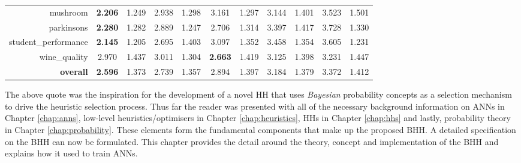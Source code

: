 \begin{table}[htbp]
{\begin{tabular}{rcccccccccc}
    mushroom & \textbf{2.206} & 1.249 & 2.938 & 1.298 & 3.161 & 1.297 & 3.144 & 1.401 & 3.523 & 1.501 \\
    parkinsons & \textbf{2.280} & 1.282 & 2.889 & 1.247 & 2.706 & 1.314 & 3.397 & 1.417 & 3.728 & 1.330 \\
    student\_performance & \textbf{2.145} & 1.205 & 2.695 & 1.403 & 3.097 & 1.352 & 3.458 & 1.354 & 3.605 & 1.231 \\
    wine\_quality & 2.970 & 1.437 & 3.011 & 1.304 & \textbf{2.663} & 1.419 & 3.125 & 1.398 & 3.231 & 1.447 \\
    \midrule
    \textbf{overall} & \textbf{2.596} & 1.373 & 2.739 & 1.357 & 2.894 & 1.397 & 3.184 & 1.379 & 3.372 & 1.412 \\
    \end{tabular}%

    }
  \label{tab:addlabel}%
\end{table}%







The above quote was the inspiration for the development of a novel \ac{HH} that uses \textit{Bayesian} probability concepts as a selection mechanism to drive the heuristic selection process. Thus far the reader was presented with all of the necessary background information on \acp{ANN} in Chapter \ref{chap:anns}, low-level heuristics/optimisers in Chapter \ref{chap:heuristics}, \acp{HH} in Chapter \ref{chap:hhs}  and lastly, probability theory in Chapter \ref{chap:probability}. These elements form the fundamental components that make up the proposed \Ac{BHH}. A detailed specification on the \Ac{BHH} can now be formulated. This chapter provides the detail around the theory, concept and implementation of the \Ac{BHH} and explains how it used to train \acp{ANN}.

